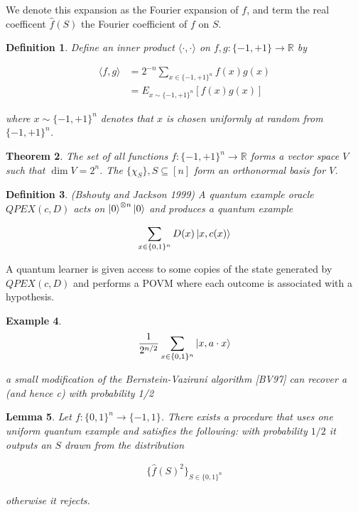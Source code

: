 \documentclass[12]{amsart}
\newcommand\0{\mathbf{0}}
\newcommand\RR{\mathbb{R}}
\newcommand\<{\langle}
\renewcommand\>{\rangle}
\newtheorem{theorem}{Theorem}[section]
\newtheorem{lemma}[theorem]{Lemma}
\newtheorem{definition}[theorem]{Definition}
\newtheorem{example}[theorem]{Example}
\begin{document}
We denote this expansion as the Fourier expansion of $f$, and term the real coefficent $\hat{f}(S)$ the Fourier coefficient of $f$ on $S$.

\begin{definition}
Define an inner product $\< \cdot, \cdot \>$ on $f, g: \{-1, +1 \} \rightarrow \RR$ 	by 

\begin{align*}
\< f, g\> &= 2^{-n} \sum_{x \in \{-1, +1\}^n} f(x)g(x) \\&= E_{x \sim \{-1, +1\}^n}[f(x)g(x)]	
\end{align*}

where $x \sim \{-1, +1\}^n$ denotes that $x$ is chosen uniformly at random from $\{-1, +1\}^n$. 
\end{definition}


\begin{theorem}
	The set of all functions $f: \{-1, +1\}^n \rightarrow \RR$ forms a vector space $V$ such that $\dim V = 2^n$. The $\{\chi_S \}, S \subseteq [n]$ form an orthonormal basis for $V$. 
\end{theorem}

\begin{definition}(Bshouty and Jackson 1999)
A quantum example oracle $QPEX(c,D)$ acts on $\ket{0}^{\otimes n}\ket{0}$ and produces a quantum example 

\begin{align}
\sum_{x\in\{0,1\}^n} D(x)\ket{x,c(x)}	
\end{align}	
\end{definition}
A quantum learner is given access to some copies of the state generated by $QPEX(c,D)$ and performs a POVM where each outcome is associated with a hypothesis. 

\begin{example}
\begin{align*}
\frac{1}{2^{n/2}} \sum_{x \in \{0,1\}^n} \ket{x, a \cdot x}	
\end{align*}

a small modification of the Bernstein-Vazirani algorithm [BV97] can recover a (and hence c) with probability 1/2
\end{example}

\begin{lemma}
Let $f : \{0,1\}^n \rightarrow \{-1,1\}$. There exists a procedure that uses one uniform quantum example and satisfies the following: with probability $1/2$ it outputs an $S$ drawn from the distribution

\begin{align*}
\{\hat{f}(S)^2\}_{S \in \{0,1\}^n}	
\end{align*}

otherwise it rejects.
\end{lemma}
\end{document}

